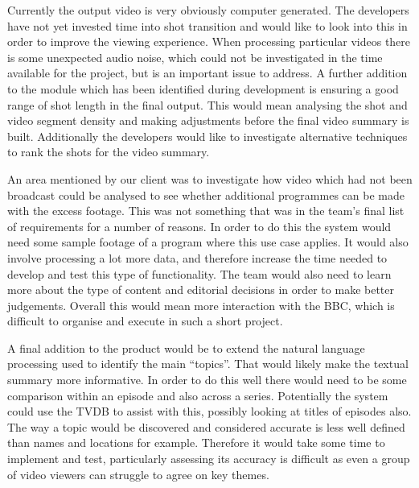 Currently the output video is very obviously computer generated. The developers have not yet invested time into shot transition and would like to 
look into this in order to improve the viewing experience. When processing particular videos there is some unexpected audio noise, which could not be 
investigated in the time available for the project, but is an important issue to address. A further addition to the module which has been identified 
during development is ensuring a good range of shot length in the final output. This would mean analysing the shot and video segment density and making 
adjustments before the final video summary is built. Additionally the developers would like to investigate alternative techniques to rank the shots 
for the video summary.

An area mentioned by our client was to investigate how video which had not been broadcast could be analysed to see whether additional programmes 
can be made with the excess footage. This was not something that was in the team's final list of requirements for a number of reasons. In order to do this 
the system would need some sample footage of a program where this use case applies. It would also involve processing a lot more data, and therefore increase 
the time needed to develop and test this type of functionality. The team would also need to learn more about the type of content and editorial decisions in 
order to make better judgements. Overall this would mean more interaction with the BBC, which is difficult to organise and execute in such a short 
project.

A final addition to the product would be to extend the natural language processing used to identify the main “topics”. That would likely make the 
textual summary more informative. In order to do this well there would need to be some comparison within an episode and also across a series. Potentially 
the system could use the TVDB to assist with this, possibly looking at titles of episodes also. The way a topic would be discovered and considered 
accurate is less well defined than names and locations for example. Therefore it would take some time to implement and test, particularly assessing 
its accuracy is difficult as even a group of video viewers can struggle to agree on key themes.